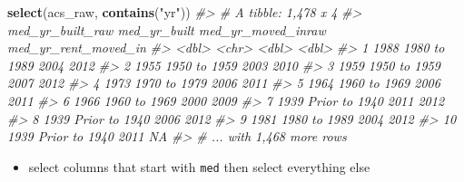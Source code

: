 \documentclass[
]{book}
\newenvironment{Shaded}{\begin{snugshade}}{\end{snugshade}}
\newcommand{\CommentTok}[1]{\textcolor[rgb]{0.56,0.35,0.01}{\textit{#1}}}
\newcommand{\KeywordTok}[1]{\textcolor[rgb]{0.13,0.29,0.53}{\textbf{#1}}}
\newcommand{\NormalTok}[1]{#1}
\newcommand{\StringTok}[1]{\textcolor[rgb]{0.31,0.60,0.02}{#1}}
\providecommand{\tightlist}{%
  \setlength{\itemsep}{0pt}\setlength{\parskip}{0pt}}
\begin{document}
\begin{Shaded}
\begin{Highlighting}[]
\KeywordTok{select}\NormalTok{(acs\_raw, }\KeywordTok{contains}\NormalTok{(}\StringTok{"yr"}\NormalTok{))}
\CommentTok{\#\textgreater{} \# A tibble: 1,478 x 4}
\CommentTok{\#\textgreater{}    med\_yr\_built\_raw med\_yr\_built  med\_yr\_moved\_inraw med\_yr\_rent\_moved\_in}
\CommentTok{\#\textgreater{}               \textless{}dbl\textgreater{} \textless{}chr\textgreater{}                      \textless{}dbl\textgreater{}                \textless{}dbl\textgreater{}}
\CommentTok{\#\textgreater{}  1             1988 1980 to 1989                2004                 2012}
\CommentTok{\#\textgreater{}  2             1955 1950 to 1959                2003                 2010}
\CommentTok{\#\textgreater{}  3             1959 1950 to 1959                2007                 2012}
\CommentTok{\#\textgreater{}  4             1973 1970 to 1979                2006                 2011}
\CommentTok{\#\textgreater{}  5             1964 1960 to 1969                2006                 2011}
\CommentTok{\#\textgreater{}  6             1966 1960 to 1969                2000                 2009}
\CommentTok{\#\textgreater{}  7             1939 Prior to 1940               2011                 2012}
\CommentTok{\#\textgreater{}  8             1939 Prior to 1940               2006                 2012}
\CommentTok{\#\textgreater{}  9             1981 1980 to 1989                2004                 2012}
\CommentTok{\#\textgreater{} 10             1939 Prior to 1940               2011                   NA}
\CommentTok{\#\textgreater{} \# ... with 1,468 more rows}
\end{Highlighting}
\end{Shaded}

\begin{itemize}
\tightlist
\item
  select columns that start with \texttt{med} then select everything else
\end{itemize}
\end{document}
